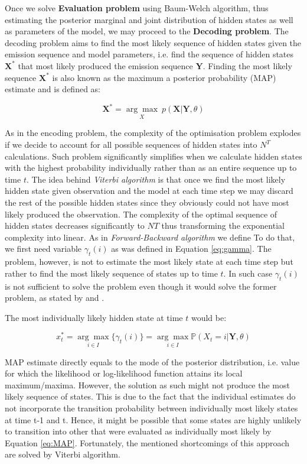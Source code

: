 Once we solve \textbf{Evaluation problem} using Baum-Welch algorithm, thus estimating the posterior marginal and joint distribution of hidden states as well as parameters of the model,
we may proceed to the \textbf{Decoding problem}. The decoding problem aims to find the most likely sequence of hidden states given the emission sequence and model parameters, i.e. 
find the sequence of hidden states $\textbf{X}^*$ that most likely produced the emission sequence $\textbf{Y}$. Finding the most likely sequence $\textbf{X}^*$ is also known as 
the maximum a posterior probability (MAP) estimate and is defined as:

\begin{equation} \label{eq:MAP}
    \textbf{X}^* = \underset{X}{\arg\max} \: p(\textbf{X}|\textbf{Y},\theta)
\end{equation}

As in the encoding problem, the complexity of the optimisation problem explodes if we decide to account for all possible sequences of hidden states into $N^T$ calculations. 
Such problem significantly simplifies when we calculate hidden states with the highest probability individually rather than as an entire sequence up to time $t$. 
The idea behind \textit{Viterbi algorithm} is that once we find the most likely hidden state given observation and the model at each time step 
we may discard the rest of the possible hidden states since they obviously could not have most likely produced the observation. The complexity of the optimal 
sequence of hidden states decreases significantly to $NT$ thus transforming the exponential complexity into linear. As in \textit{Forward-Backward algorithm} we define 
To do that, we first need variable $\gamma_t(i)$ as was defined in Equation \ref{eq:gamma}. The problem, however, is not to estimate the most likely state at each time step
but rather to find the most likely sequence of states up to time $t$. In such case $\gamma_t(i)$ is not sufficient to solve the problem even though it would solve the former problem, as stated by \citep{Rabiner1989} and \citep{Oliver2013}.

The most individually likely hidden state at time $t$ would be:

\begin{equation}
    x_t^* = \underset{i \in I}{\arg\max} \{\gamma_t(i)\} = \underset{i \in I}{\arg\max} \mathbb{P}(X_t=i|\textbf{Y},\theta)
\end{equation}

MAP estimate directly equals to the mode of the posterior distribution, i.e. value for which the likelihood or log-likelihood function attains its local maximum/maxima. 
However, the solution as such might not produce the most likely sequence of states. This is due to the fact that the individual estimates do not incorporate 
the transition probability between individually most likely states at time t-1 and t. Hence, it might be possible that some states are highly unlikely to transition 
into other that were evaluated as individually most likely by Equation \ref{eq:MAP}. Fortunately, the mentioned shortcomings of this approach are solved by Viterbi algorithm.

